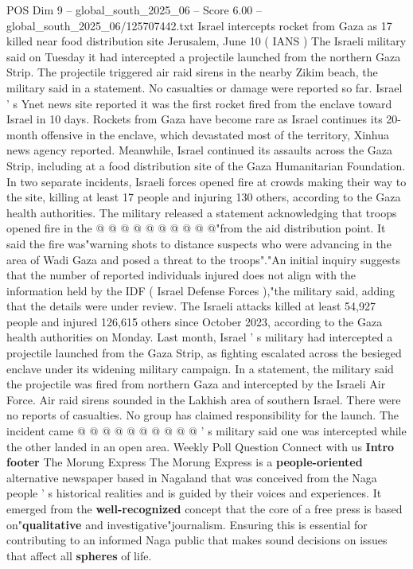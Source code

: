\begin{textsample}{POS Dim 9 – global\_south\_2025\_06 – Score 6.00 – global\_south\_2025\_06/125707442.txt}  \label{ex:f9_pos_171}
Israel intercepts rocket from Gaza as 17 killed near food distribution site Jerusalem, June 10 ( IANS ) The Israeli military said on Tuesday it had intercepted a projectile launched from the northern Gaza Strip.
The projectile triggered air raid sirens in the nearby Zikim beach, the military said in a statement.
No casualties or damage were reported so far.
Israel ' s Ynet news site reported it was the first rocket fired from the enclave toward Israel in 10 days.
Rockets from Gaza have become rare as Israel continues its 20-month offensive in the enclave, which devastated most of the territory, Xinhua news agency reported.
Meanwhile, Israel continued its assaults across the Gaza Strip, including at a food distribution site of the Gaza Humanitarian Foundation.
In two separate incidents, Israeli forces opened fire at crowds making their way to the site, killing at least 17 people and injuring 130 others, according to the Gaza health authorities.
The military released a statement acknowledging that troops opened fire in the @ @ @ @ @ @ @ @ @ @"from the aid distribution point.
It said the fire was"warning shots to distance suspects who were advancing in the area of Wadi Gaza and posed a threat to the troops"."An initial inquiry suggests that the number of reported individuals injured does not align with the information held by the IDF ( Israel Defense Forces ),"the military said, adding that the details were under review.
The Israeli attacks killed at least 54,927 people and injured 126,615 others since October 2023, according to the Gaza health authorities on Monday.
Last month, Israel ' s military had intercepted a projectile launched from the Gaza Strip, as fighting escalated across the besieged enclave under its widening military campaign.
In a statement, the military said the projectile was fired from northern Gaza and intercepted by the Israeli Air Force.
Air raid sirens sounded in the Lakhish area of southern Israel.
There were no reports of casualties.
No group has claimed responsibility for the launch.
The incident came @ @ @ @ @ @ @ @ @ @ ' s military said one was intercepted while the other landed in an open area.
Weekly Poll Question Connect with us \textbf{Intro} \textbf{footer} The Morung Express The Morung Express is a \textbf{people-oriented} alternative newspaper based in Nagaland that was conceived from the Naga people ' s historical realities and is guided by their voices and experiences.
It emerged from the \textbf{well-recognized} concept that the core of a free press is based on"\textbf{qualitative} and investigative"journalism.
Ensuring this is essential for contributing to an informed Naga public that makes sound decisions on issues that affect all \textbf{spheres} of life.

\end{textsample}

